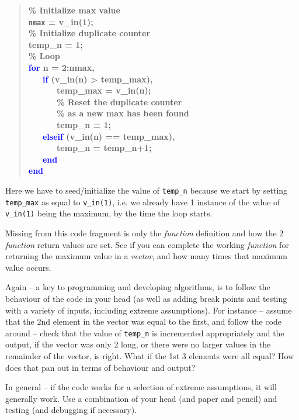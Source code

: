 \documentclass{tufte-book} %
\newenvironment{docspecbold}{\begin{quotation}\ttfamily\bfseries\parskip0pt\parindent0pt\ignorespaces}{\end{quotation}}
\begin{document}
\begin{docspecbold}
\textcolor[rgb]{0,0.501961,0}{\% Initialize max value}\\
\texttt{nmax} = v\_in(1);\\
\textcolor[rgb]{0,0.501961,0}{\% Initialize duplicate counter}\\
temp\_n = 1;\\
\textcolor[rgb]{0,0.501961,0}{\% Loop}\\
\textcolor{blue}{for} n = 2:nmax,\\
\ \ \ \textcolor{blue}{if} (v\_in(n) > temp\_max),\\
\ \ \ \ \ \ temp\_max = v\_in(n);\\\textcolor[rgb]{0,0.501961,0}{
\ \ \ \ \ \ \% Reset the duplicate counter\\
\ \ \ \ \ \ \% as a new max has been found\\}
\ \ \ \ \ \ temp\_n = 1;\\
\ \ \ \textcolor{blue}{elseif} (v\_in(n) == temp\_max),\\
\ \ \ \ \ \ temp\_n = temp\_n+1;\\
\ \ \ \textcolor{blue}{end}\\
\textcolor{blue}{end}
\end{docspecbold}
Here we have to seed/initialize the value of \texttt{temp\_n} because we start by setting \texttt{temp\_max} as equal to \texttt{v\_in(1)}, i.e. we already have 1 instance of the value of \texttt{v\_in(1)} being the maximum, by the time the loop starts.

Missing from this code fragment is only the \textit{function} definition and how the 2 \textit{function} return values are set. See if you can complete the working \textit{function} for returning the maximum value in a \textit{vector}, and how many times that maximum value occurs.

Again -- a key to programming and developing algorithms, is to follow the behaviour of the code in your head (as well as adding break points and testing with a variety of inputs, including extreme assumptions). For instance -- assume that the 2nd element in the vector was equal to the first, and follow the code around -- check that the value of \texttt{temp\_n} is incremented appropriately and the output, if the vector was only 2 long, or there were no larger values in the remainder of the vector, is right. What if the 1st 3 elements were all equal? How does that pan out in terms of behaviour and output?

In general -- if the code works for a selection of extreme assumptions, it will generally work. Use a combination of your head (and paper and pencil) and testing (and debugging if necessary).
\end{document}

